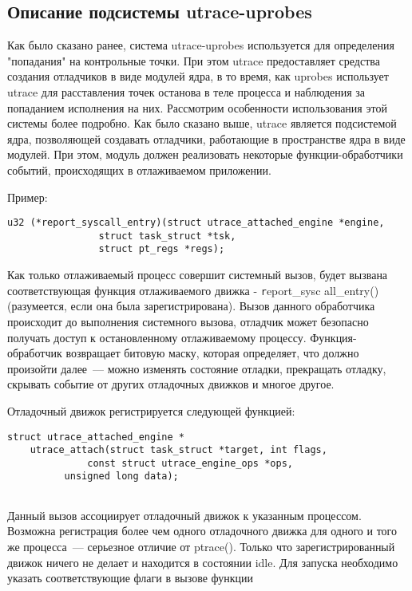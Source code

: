 \subsection{Описание подсистемы utrace-uprobes}

\bigskip
Как было сказано ранее, система utrace-uprobes используется 
для определения "попадания" на контрольные точки.
При этом utrace предоставляет средства создания 
отладчиков в виде модулей ядра, в то время, как 
uprobes использует utrace для расставления точек 
останова в теле процесса и наблюдения за попаданием 
исполнения на них. 
Рассмотрим особенности использования этой системы 
более подробно.
Как было сказано выше, utrace является подсистемой 
ядра, позволяющей создавать отладчики, работающие в 
пространстве ядра в виде модулей. При этом, модуль 
должен реализовать некоторые функции-обработчики 
событий, происходящих в отлаживаемом приложении. 

Пример:

\bigskip
\begin{lstlisting}
u32 (*report_syscall_entry)(struct utrace_attached_engine *engine,
				struct task_struct *tsk,
				struct pt_regs *regs);

\end{lstlisting}

\bigskip
Как только отлаживаемый процесс совершит системный вызов, будет вызвана 
соответствующая функция отлаживаемого движка - {\texttt report\_sysc
all\_entry()} (разумеется, если она была зарегистрирована). Вызов 
данного обработчика происходит до выполнения системного вызова, 
отладчик может безопасно получать доступ к остановленному отлаживаемому 
процессу. Функция-обработчик возвращает битовую маску, которая определяет, что 
должно произойти далее~--- можно изменять состояние отладки, 
прекращать отладку, скрывать событие от других отладочных 
движков и многое другое. 

Отладочный движок регистрируется следующей функцией: 
\bigskip
\begin{lstlisting}
struct utrace_attached_engine *
    utrace_attach(struct task_struct *target, int flags,
	      	  const struct utrace_engine_ops *ops, 
		  unsigned long data);
  
\end{lstlisting}

\bigskip 
Данный вызов ассоциирует отладочный движок к указанным процессом. 
Возможна регистрация более чем одного отладочного движка для 
одного и того же процесса~--- серьезное отличие от ptrace(). 
Только что зарегистрированный движок ничего не делает и 
находится в состоянии idle. Для запуска необходимо указать 
соответствующие флаги в вызове функции 

